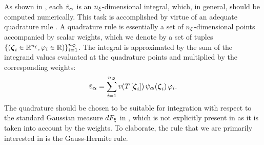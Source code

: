 As shown in , each $\hat{v}_{\boldsymbol \alpha}$ is an ${n_\xi}$-dimensional integral, which, in general, should be computed numerically.
This task is accomplished by virtue of an adequate quadrature rule \cite{press2007}.
A quadrature rule is essentially a set of ${n_\xi}$-dimensional points accompanied by scalar weights, which we denote by a set of tuples $\{ ({\boldsymbol\zeta}_i \in \mathbb{R}^{n_\xi}, \varphi_i \in \mathbb{R}) \}_{i = 1}^{n_\mathcal{Q}}$.
The integral is approximated by the sum of the integrand values evaluated at the quadrature points and multiplied by the corresponding weights:
\begin{equation} \xelab{non-intrusive-orthogonal-projection}
  \coefficient{\w}_{\multiindex} = \sum_{i = 1}^\nqorder \w(\transformation{\point_i}) \, \polynomial_{\multiindex}(\point_i) \, \weight_i.
\end{equation}
The quadrature should be chosen to be suitable for integration with respect to the standard Gaussian measure $dF_\xi$ in , which is not explicitly present in  as it is taken into account by the weights.
To elaborate, the rule that we are primarily interested in is the Gauss-Hermite rule.

